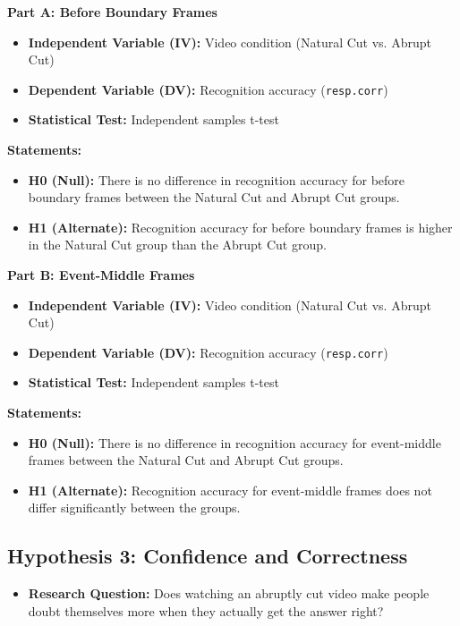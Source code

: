 \documentclass[10pt,a4paper]{article}
\begin{document}
\textbf{Part A: Before Boundary Frames}
\begin{itemize}
    \item \textbf{Independent Variable (IV):} Video condition (Natural Cut vs. Abrupt Cut)
    \item \textbf{Dependent Variable (DV):} Recognition accuracy (\texttt{resp.corr})
    \item \textbf{Statistical Test:} Independent samples t-test
\end{itemize}

\textbf{Statements:}
\begin{itemize}
    \item \textbf{H0 (Null):} There is no difference in recognition accuracy for before boundary frames between the Natural Cut and Abrupt Cut groups.
    \item \textbf{H1 (Alternate):} Recognition accuracy for before boundary frames is higher in the Natural Cut group than the Abrupt Cut group.
\end{itemize}

\textbf{Part B: Event-Middle Frames}
\begin{itemize}
    \item \textbf{Independent Variable (IV):} Video condition (Natural Cut vs. Abrupt Cut)
    \item \textbf{Dependent Variable (DV):} Recognition accuracy (\texttt{resp.corr})
    \item \textbf{Statistical Test:} Independent samples t-test
\end{itemize}

\textbf{Statements:}
\begin{itemize}
    \item \textbf{H0 (Null):} There is no difference in recognition accuracy for event-middle frames between the Natural Cut and Abrupt Cut groups.
    \item \textbf{H1 (Alternate):} Recognition accuracy for event-middle frames does not differ significantly between the groups.
\end{itemize}

\subsection{Hypothesis 3: Confidence and Correctness}
\begin{itemize}
    \item \textbf{Research Question:} Does watching an abruptly cut video make people doubt themselves more when they actually get the answer right?
\end{itemize}
\end{document}
